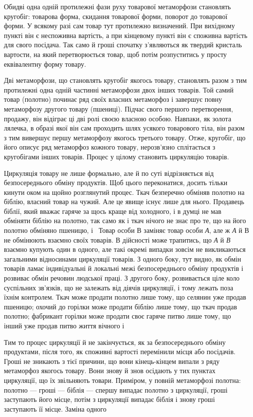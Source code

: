
Обидві одна одній протилежні фази руху товарової метаморфози
становлять кругобіг: товарова форма, скидання товарової
форми, поворот до товарової форми. У всякому разі сам товар
тут протилежно визначений. При вихідному пункті він є неспоживна
вартість, а при кінцевому пункті він є споживна вартість
для свого посідача. Так само й гроші спочатку з’являються як
твердий кристаль вартости, на який перетворюється товар, щоб
потім розпуститись у просту еквівалентну форму товару.

Дві метаморфози, що становлять кругобіг якогось товару,
становлять разом з тим протилежні одна одній частинні метаморфози
двох інших товарів. Той самий товар (полотно) починає ряд
своїх власних метаморфоз і завершує повну метаморфозу другого
товару (пшениці). Підчас свого першого перетворення, продажу,
він відіграє ці дві ролі своєю власною особою. Навпаки, як золота
лялечка, в образі якої він сам проходить шлях усякого товарового
тіла, він разом з тим вивершує першу метаморфозу якогось третього
товару. Отже, кругобіг, що його описує ряд метаморфоз
кожного товару, нерозв’язно сплітається з кругобігами інших
товарів. Процес у цілому становить циркуляцію товарів.

Циркуляція товару не лише формально, але й по суті відрізняється
від безпосереднього обміну продуктів. Щоб цього переконатися,
досить тільки кинути оком на щойно розглянутий процес.
Ткач безперечно обміняв полотно на біблію, власний товар на
чужий. Але це явище існує лише для нього. Продавець біблії,
який вважає гаряче за щось краще від холодного, і в думці не
мав обміняти біблію на полотно, так само як і ткач нічого не
знає про те, що на його полотно обміняно пшеницю, і~ Товар
особи В заміняє товар особи \emph{А}, але ж \emph{А} й \emph{}В не обмінюють взаємно
своїх товарів. В дійсності може трапитись, що \emph{А} й \emph{В} взаємно
купують один в одного, але такі окремі випадки зовсім не викликаються
загальними відносинами циркуляції товарів. З одного
боку, тут видно, як обмін товарів ламає індивідуальні й локальні
межі безпосереднього обміну продуктів і розвиває обмін
речовин людської праці. З другого боку, розвивається ціле коло
суспільних зв’язків, що не залежать від діячів циркуляції,
і тому лежать поза їхнім контролем. Ткач може продати полотно
лише тому, що селянин уже продав пшеницю; охочий до горілки
може продати біблію лише тому, що ткач продав полотно; фабрикант
горілки може продати своє гаряче питво лише тому, що інший
уже продав питво життя вічного і~

Тим то процес циркуляції й не закінчується, як за безпосереднього
обміну продуктами, після того, як споживні вартості
перемінили місця або посідачів. Гроші не зникають з тієї причини,
що вони кінець-кінцем випали з ряду метаморфоз якогось
товару. Вони знову й знов осідають у тих пунктах циркуляції,
що їх звільняють товари. Приміром, у повній метаморфозі полотна:
полотно — гроші — біблія — спершу випадає полотно з
циркуляції, гроші заступають його місце, потім з циркуляції
випадає біблія і знову гроші заступають її місце. Заміна одного
\parbreak{}  %
